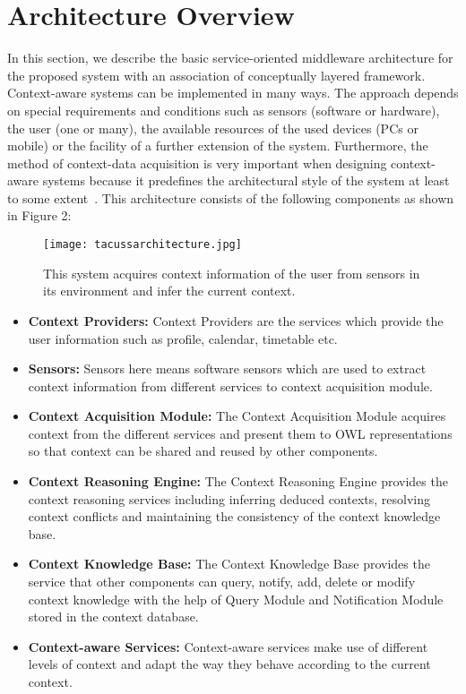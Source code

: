 \documentclass[copyright,creativecommons,noderivs,noncommercial]{eptcs}
\begin{document}
\section{Architecture Overview}
In this section, we describe the basic service-oriented middleware architecture for the proposed system with an association of conceptually layered framework. Context-aware systems can be implemented in many ways. The approach depends on special requirements and conditions such as sensors (software or hardware), the user (one or many), the available resources of the used devices (PCs or mobile) or the facility of a further extension of the system. Furthermore, the method of context-data acquisition is very important when designing context-aware systems because it predefines the architectural style of the system at least to some extent~\cite{k3}. This architecture consists of the following components as shown in Figure 2:

\begin{figure}[h]
  \begin{center}
  \texttt{[image: tacussarchitecture.jpg]}
  \end{center}
    \caption{This system acquires context information of the user from sensors in its environment and infer the current context.}
    \label{fig2}
\end{figure}

\begin{itemize}
  \item \textbf{Context Providers:} Context Providers are the services which provide the user information such as profile, calendar, timetable etc.
  \item \textbf{Sensors:} Sensors here means software sensors which are used to extract context information from different services to context acquisition module.
  \item \textbf{Context Acquisition Module:} The Context Acquisition Module acquires context from the different services and present them to OWL representations so that context can be shared and reused by other components.
  \item \textbf{Context Reasoning Engine:} The Context Reasoning Engine provides the context reasoning services including inferring deduced contexts, resolving context conflicts and maintaining the consistency of the context knowledge base.
  \item \textbf{Context Knowledge Base:} The Context Knowledge Base provides the service that other components can query, notify, add, delete or modify context knowledge with the help of Query Module and Notification Module stored in the context database.
  \item \textbf{Context-aware Services:} Context-aware services make use of different levels of context and adapt the way they behave according to the current context.
\end{itemize}
\end{document}
